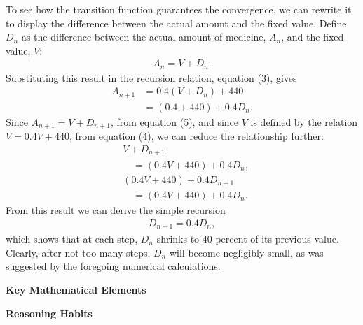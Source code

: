 {\begin{description}
      To see how the transition function guarantees the convergence, we can rewrite it to display the difference between the actual amount and the fixed value. Define $D_n$ as the difference between the actual amount of medicine, $A_n$, and the fixed value, $V$:
        \begin{align*}
          A_n=V+D_n. \tag{5}
        \end{align*} 
      Substituting this result in the recursion relation, equation (3), gives
      \begin{align*}
        A_{n+1}
          &=0.4(V+D_n)+440\\
          &=(0.4+440)+0.4D_n. \tag{6}
      \end{align*} 
      Since $A_{n+1} = V + D_{n+1}$, from equation (5), and since $V$ is defined by the relation $V = 0.4V + 440$, from equation (4), we can reduce the relationship further:
      \begin{align*}
        &V+D_{n+1} \\
        &\quad =(0.4V+440)+0.4D_n, \\
        & (0.4V+440)+0.4D_{n+1} \\
        &\quad =(0.4V+440)+0.4D_n.  
      \end{align*}
      From this result we can derive the simple recursion
        \begin{align*}
          D_{n+1}=0.4D_n, \tag{7}
        \end{align*}   
      which shows that at each step, $D_n$ shrinks to $40$ percent of its previous value. Clearly, after not too many steps, $D_n$ will become negligibly small, as was suggested by the foregoing numerical calculations.
    \end{description}\vspace{.5\baselineskip}

    \textbf{Key Mathematical Elements}

    \begin{hanglist}
    \end{hanglist}

    \textbf{Reasoning Habits}

    \begin{hanglist}
    \end{hanglist}
  }
